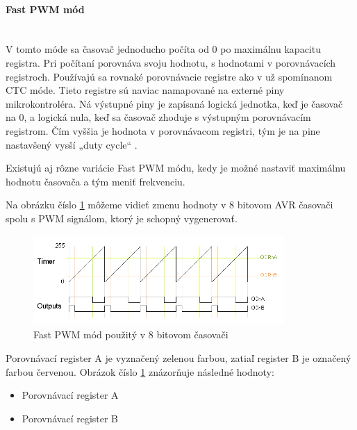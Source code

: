 \paragraph{Fast PWM mód} \mbox{}\\
V tomto móde sa časovač jednoducho počíta od 0 po maximálnu kapacitu registra. Pri počítaní porovnáva svoju hodnotu, s hodnotami v porovnávacích registroch.
Používajú sa rovnaké porovnávacie registre ako v už spomínanom CTC móde. Tieto registre sú naviac namapované na externé piny mikrokontroléra.
Ná výstupné piny je zapísaná logická jednotka, keď je časovač na 0, a logická nula, keď sa časovač zhoduje s výstupným porovnávacím registrom. Čím vyššia je hodnota
v porovnávacom registri, tým je na pine nastavšený vysší „duty cycle“ \cite{shirriffSecretsArduinoPWM}. \par
Existujú aj rôzne variácie Fast PWM módu, kedy je možné nastaviť maximálnu hodnotu časovača a tým meniť frekvenciu. \par
Na obrázku číslo \ref{figure:fast-pwm-mode} môžeme vidieť zmenu hodnoty v 8 bitovom AVR časovači spolu s PWM signálom, ktorý je schopný vygenerovať.
\begin{figure}[!h]
    \centering
    \includegraphics[width=0.85\textwidth]{img/fast-pwm-graph.png}
    \caption{Fast PWM mód použitý v 8 bitovom časovači}
    \label{figure:fast-pwm-mode}
\end{figure}

Porovnávací register A je vyznačený zelenou farbou, zatiaľ register B je označený farbou červenou. Obrázok číslo \ref{figure:fast-pwm-mode} znázorňuje následné hodnoty:
\begin{itemize}
    \item Porovnávací register A
    \item Porovnávací register B
\end{itemize}

